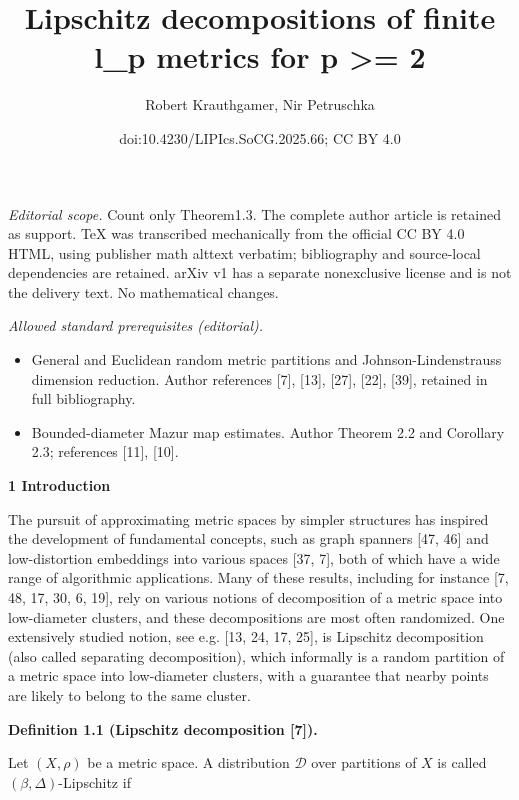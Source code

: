 \documentclass[10pt,a4paper]{amsart}
\title{Lipschitz decompositions of finite l\_p metrics for p >= 2}
\author{Robert Krauthgamer, Nir Petruschka}
\date{doi:10.4230/LIPIcs.SoCG.2025.66; CC BY 4.0}
\begin{document}
\maketitle
\noindent\textit{Editorial scope.} Count only Theorem1.3. The complete author article is retained as support. TeX was transcribed mechanically from the official CC BY 4.0 HTML, using publisher math alttext verbatim; bibliography and source-local dependencies are retained. arXiv v1 has a separate nonexclusive license and is not the delivery text. No mathematical changes.\par\medskip
\noindent\textit{Allowed standard prerequisites (editorial).}\begin{itemize}
\item General and Euclidean random metric partitions and Johnson-Lindenstrauss dimension reduction. Author references [7], [13], [27], [22], [39], retained in full bibliography.
\item Bounded-diameter Mazur map estimates. Author Theorem 2.2 and Corollary 2.3; references [11], [10].
\end{itemize}\medskip
\par\medskip\noindent\textbf{1 Introduction}\par
The pursuit of approximating metric spaces by simpler structures has inspired the development of fundamental concepts, such as graph spanners [47, 46] and low-distortion embeddings into various spaces [37, 7], both of which have a wide range of algorithmic applications. Many of these results, including for instance [7, 48, 17, 30, 6, 19], rely on various notions of decomposition of a metric space into low-diameter clusters, and these decompositions are most often randomized. One extensively studied notion, see e.g. [13, 24, 17, 25], is Lipschitz decomposition (also called separating decomposition), which informally is a random partition of a metric space into low-diameter clusters, with a guarantee that nearby points are likely to belong to the same cluster.
\par
\par
\par\medskip\noindent\textbf{Definition 1.1 (Lipschitz decomposition [7]).}\par
Let $(X,\rho)$ be a metric space. A distribution $\mathcal{D}$ over partitions of $X$ is called $(\beta,\Delta)$-Lipschitz if
\par
\end{document}
